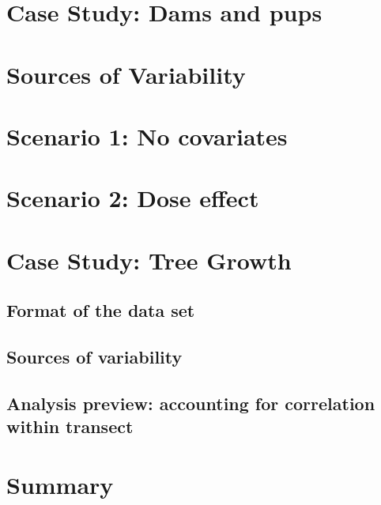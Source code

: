 \documentclass[
]{krantz}
\begin{document}
\hypertarget{case-study-dams-and-pups}{%
\section{Case Study: Dams and pups}\label{case-study-dams-and-pups}}

\hypertarget{sources-of-variability}{%
\section{Sources of Variability}\label{sources-of-variability}}

\hypertarget{scenario-1-no-covariates}{%
\section{Scenario 1: No covariates}\label{scenario-1-no-covariates}}

\hypertarget{scenario-2-dose-effect}{%
\section{Scenario 2: Dose effect}\label{scenario-2-dose-effect}}

\hypertarget{case-study-tree-growth}{%
\section{Case Study: Tree Growth}\label{case-study-tree-growth}}

\hypertarget{format-of-the-data-set}{%
\subsection{Format of the data set}\label{format-of-the-data-set}}

\hypertarget{sources-of-variability-1}{%
\subsection{Sources of variability}\label{sources-of-variability-1}}

\hypertarget{analysis-preview-accounting-for-correlation-within-transect}{%
\subsection{Analysis preview: accounting for correlation within transect}\label{analysis-preview-accounting-for-correlation-within-transect}}

\hypertarget{summary-2}{%
\section{Summary}\label{summary-2}}
\end{document}

